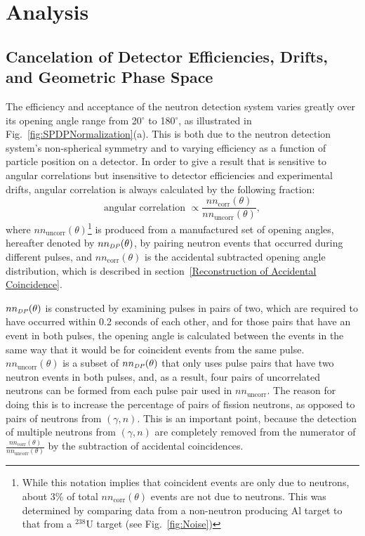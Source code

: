 \section{Analysis}
\label{Analysis}

\subsection{Cancelation of Detector Efficiencies, Drifts, and Geometric Phase Space}
\label{subsec:SPDPCancelation}
The efficiency and acceptance of the neutron detection system varies greatly over its opening angle range from 20$^{\circ}$ to 180$^{\circ}$, as illustrated in Fig.~\ref{fig:SPDPNormalization}(a).
This is both due to the neutron detection system's non-spherical symmetry and to varying efficiency as a function of particle position on a detector.
In order to give a result that is sensitive to angular correlations but insensitive to detector efficiencies and experimental drifts, angular correlation is always calculated by the following fraction:
\begin{displaymath}
\text{angular correlation }  \propto \frac{nn_{\text{corr}}(\theta)}{nn_{\text{uncorr}}(\theta)},
\end{displaymath}
 where $nn_{\text{uncorr}}(\theta)$\footnote{While this notation implies that coincident events are only due to neutrons, about 3\% of total  $nn_{\text{corr}}(\theta)$ events are not due to neutrons. This was determined by comparing data from a non-neutron producing Al target to that from a $^{238}$U target (see Fig.~\ref{fig:Noise})} is produced from a manufactured set of opening angles, hereafter denoted by $nn_{\scaleto{DP}{4pt}}(\theta)$, by pairing neutron events that occurred during different pulses, and $nn_{\text{corr}}(\theta)$ is the accidental subtracted opening angle distribution, which is described in section~\ref{Reconstruction of Accidental Coincidence}.

$nn_{\scaleto{DP}{4pt}}(\theta)$ is constructed by examining pulses in pairs of two, which are required to have occurred within 0.2 seconds of each other, and for those pairs that have an event in both pulses, the opening angle is calculated between the events in the same way that it would be for coincident events from the same pulse.
$nn_{\text{uncorr}}(\theta)$ is a subset of $nn_{\scaleto{DP}{4pt}}(\theta)$ that only uses pulse pairs that have two neutron events in both pulses, and, as a result, four pairs of uncorrelated neutrons can be formed from each pulse pair used in $nn_{\text{uncorr}}$. 
The reason for doing this is to increase the percentage of pairs of fission neutrons, as opposed to pairs of neutrons from $(\gamma,n)$.
This is an important point, because the detection of multiple neutrons from $(\gamma,n)$ are completely removed from the numerator of $\frac{nn_{\text{corr}}(\theta)}{nn_{\text{uncorr}}(\theta)}$ by the subtraction of accidental coincidences.

